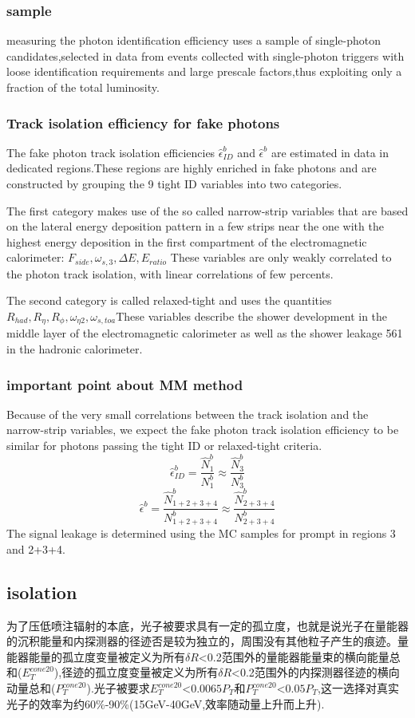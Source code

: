 \documentclass{ctexart}
\begin{document}
\subsubsection{sample}
measuring the photon identification efficiency uses a sample of single-photon candidates,selected in data from events collected with single-photon triggers with loose identification requirements and large prescale factors,thus exploiting only a fraction of the total luminosity.
\subsubsection{Track isolation efficiency for fake photons}
The fake photon track isolation efficiencies $\hat{\epsilon}_{ID}^b$ and $\hat{\epsilon}^b$ are estimated in data in dedicated regions.These regions are highly enriched in fake photons and are constructed by grouping the 9 tight ID variables into two categories.\par
The first category makes use of the so called narrow-strip variables that are based on the
lateral energy deposition pattern in a few strips near the one with the highest energy deposition in the first
compartment of the electromagnetic calorimeter: $F_{side},\omega_{s,3},\Delta E,E_{ratio}$ These variables are only weakly
 correlated to the photon track isolation, with linear correlations of few percents.\par
 The second category
is called relaxed-tight and uses the quantities $R_{had},R_\eta,R_\phi,\omega_{\eta2},\omega_{s,toa}$These variables describe the shower development in the middle layer of the electromagnetic calorimeter as well as the shower leakage
561 in the hadronic calorimeter.
\subsubsection{important point about MM method}
Because of the very small correlations between the
track isolation and the narrow-strip variables, we expect the fake photon track isolation efficiency to be
similar for photons passing the tight ID or relaxed-tight criteria.
$$\hat{\epsilon}_{ID}^b=\frac{\hat{N}_1^b}{N_1^b}\approx\frac{\hat{N}_3^b}{N_3^b}$$
$$\hat{\epsilon}^b=\frac{\hat{N}_{1+2+3+4}^b}{N_{1+2+3+4}^b}\approx\frac{\hat{N}_{2+3+4}^b}{N_{2+3+4}^b}$$
The signal leakage is determined using the MC samples for prompt in regions 3 and 2+3+4.
\subsection{isolation}
为了压低喷注辐射的本底，光子被要求具有一定的孤立度，也就是说光子在量能器的沉积能量和内探测器的径迹否是较为独立的，周围没有其他粒子产生的痕迹。量能器能量的孤立度变量被定义为所有$\delta R$<0.2范围外的量能器能量束的横向能量总和($E_T^{cone20}$),径迹的孤立度变量被定义为所有$\delta R$<0.2范围外的内探测器径迹的横向动量总和($P_T^{cone20}$).光子被要求$E_T^{cone20}$<$0.0065P_T$和$P_T^{cone20}$<$0.05P_T$,这一选择对真实光子的效率为约60\%-90\%(15GeV-40GeV,效率随动量上升而上升).\\
\end{document}

